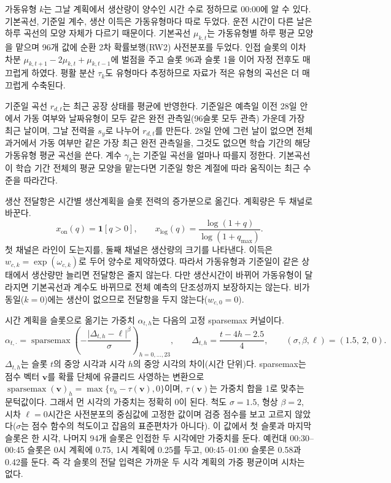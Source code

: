 가동유형 $k$는 그날 계획에서 생산량이 양수인 시간 수로 정하므로 00:00에 알 수 있다. 기본곡선, 기준일 계수, 생산 이득은 가동유형마다 따로 두었다. 운전 시간이 다른 날은 하루 곡선의 모양 자체가 다르기 때문이다. 기본곡선 $\mu_{k,t}$는 가동유형별 하루 평균 모양을 맡으며 96개 값에 순환 2차 확률보행(RW2) 사전분포를 두었다. 인접 슬롯의 이차 차분 $\mu_{k,t+1}-2\mu_{k,t}+\mu_{k,t-1}$에 벌점을 주고 슬롯 96과 슬롯 1을 이어 자정 전후도 매끄럽게 하였다. 평활 분산 $\tau_k$도 유형마다 추정하므로 자료가 적은 유형의 곡선은 더 매끄럽게 수축된다.

기준일 곡선 $r_{d,t}$는 최근 공장 상태를 평균에 반영한다. 기준일은 예측일 이전 28일 안에서 가동 여부와 날짜유형이 모두 같은 완전 관측일(96슬롯 모두 관측) 가운데 가장 최근 날이며, 그날 전력을 $s_y$로 나누어 $r_{d,t}$를 만든다. 28일 안에 그런 날이 없으면 전체 과거에서 가동 여부만 같은 가장 최근 완전 관측일을, 그것도 없으면 학습 기간의 해당 가동유형 평균 곡선을 쓴다. 계수 $\gamma_k$는 기준일 곡선을 얼마나 따를지 정한다. 기본곡선이 학습 기간 전체의 평균 모양을 맡는다면 기준일 항은 계절에 따라 움직이는 최근 수준을 따라간다.

생산 전달항은 시간별 생산계획을 슬롯 전력의 증가분으로 옮긴다. 계획량은 두 채널로 바꾼다.
\begin{equation}
x_{\mathrm{on}}(q)=\mathbf 1[q>0],\qquad
x_{\log}(q)=\frac{\log(1+q)}{\log(1+q_{\max})}.
\label{eq:ch2-channels}
\end{equation}
첫 채널은 라인이 도는지를, 둘째 채널은 생산량의 크기를 나타낸다. 이득은 $w_{c,k}=\exp(\omega_{c,k})$로 두어 양수로 제약하였다. 따라서 가동유형과 기준일이 같은 상태에서 생산량만 늘리면 전달항은 줄지 않는다. 다만 생산시간이 바뀌어 가동유형이 달라지면 기본곡선과 계수도 바뀌므로 전체 예측의 단조성까지 보장하지는 않는다. 비가동일($k=0$)에는 생산이 없으므로 전달항을 두지 않는다($w_{c,0}=0$).

시간 계획을 슬롯으로 옮기는 가중치 $\alpha_{t,h}$는 다음의 고정 sparsemax 커널이다.
\begin{equation}
\alpha_{t,\cdot} = \operatorname{sparsemax}\!\left(-\frac{\lvert \Delta_{t,h} - \ell\rvert^{\beta}}{\sigma}\right)_{h=0,\dots,23},
\qquad \Delta_{t,h}=\frac{t-4h-2.5}{4},
\qquad (\sigma,\beta,\ell)=(1.5,\ 2,\ 0).
\label{eq:ch2-kernel}
\end{equation}
$\Delta_{t,h}$는 슬롯 $t$의 중앙 시각과 시각 $h$의 중앙 시각의 차이(시간 단위)다. sparsemax는 점수 벡터 $\boldsymbol v$를 확률 단체에 유클리드 사영하는 변환으로 $\operatorname{sparsemax}(\boldsymbol v)_h=\max\{v_h-\tau(\boldsymbol v),0\}$이며, $\tau(\boldsymbol v)$는 가중치 합을 1로 맞추는 문턱값이다. 그래서 먼 시각의 가중치는 정확히 0이 된다. 척도 $\sigma=1.5$, 형상 $\beta=2$, 시차 $\ell=0$시간은 사전분포의 중심값에 고정한 값이며 검증 점수를 보고 고르지 않았다($\sigma$는 점수 함수의 척도이고 잡음의 표준편차가 아니다). 이 값에서 첫 슬롯과 마지막 슬롯은 한 시각, 나머지 94개 슬롯은 인접한 두 시각에만 가중치를 둔다. 예컨대 00:30--00:45 슬롯은 0시 계획에 0.75, 1시 계획에 0.25를 두고, 00:45--01:00 슬롯은 0.58과 0.42를 둔다. 즉 각 슬롯의 전달 입력은 가까운 두 시각 계획의 가중 평균이며 시차는 없다.

